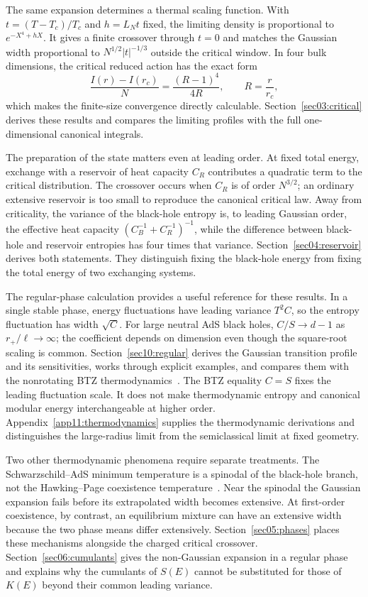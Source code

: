 \documentclass[11pt,letterpaper]{article}
\theoremstyle{plain}
\theoremstyle{definition}
\theoremstyle{remark}
\begin{document}
The same expansion determines a thermal scaling function. With $t=(T-T_c)/T_c$ and $h=L_Nt$ fixed, the limiting density is proportional to $e^{-X^4+hX}$. It gives a finite crossover through $t=0$ and matches the Gaussian width proportional to $N^{1/2}|t|^{-1/3}$ outside the critical window. In four bulk dimensions, the critical reduced action has the exact form
\begin{equation}
 \frac{I(r)-I(r_c)}{N}=\frac{(R-1)^4}{4R},\qquad R=\frac r{r_c},
 \label{eq01:exact_action}
\end{equation}
which makes the finite-size convergence directly calculable. Section~\ref{sec03:critical} derives these results and compares the limiting profiles with the full one-dimensional canonical integrals.

The preparation of the state matters even at leading order. At fixed total energy, exchange with a reservoir of heat capacity $C_R$ contributes a quadratic term to the critical distribution. The crossover occurs when $C_R$ is of order $N^{3/2}$; an ordinary extensive reservoir is too small to reproduce the canonical critical law. Away from criticality, the variance of the black-hole entropy is, to leading Gaussian order, the effective heat capacity $(C_B^{-1}+C_R^{-1})^{-1}$, while the difference between black-hole and reservoir entropies has four times that variance. Section~\ref{sec04:reservoir} derives both statements. They distinguish fixing the black-hole energy from fixing the total energy of two exchanging systems.

The regular-phase calculation provides a useful reference for these results. In a single stable phase, energy fluctuations have leading variance $T^2C$, so the entropy fluctuation has width $\sqrt C$. For large neutral AdS black holes, $C/S\to d-1$ as $r_+/\ell\to\infty$; the coefficient depends on dimension even though the square-root scaling is common. Section~\ref{sec10:regular} derives the Gaussian transition profile and its sensitivities, works through explicit examples, and compares them with the nonrotating BTZ thermodynamics~\cite{banados1992}. The BTZ equality $C=S$ fixes the leading fluctuation scale. It does not make thermodynamic entropy and canonical modular energy interchangeable at higher order. Appendix~\ref{app11:thermodynamics} supplies the thermodynamic derivations and distinguishes the large-radius limit from the semiclassical limit at fixed geometry.

Two other thermodynamic phenomena require separate treatments. The Schwarzschild--AdS minimum temperature is a spinodal of the black-hole branch, not the Hawking--Page coexistence temperature~\cite{hawkingpage1983}. Near the spinodal the Gaussian expansion fails before its extrapolated width becomes extensive. At first-order coexistence, by contrast, an equilibrium mixture can have an extensive width because the two phase means differ extensively. Section~\ref{sec05:phases} places these mechanisms alongside the charged critical crossover. Section~\ref{sec06:cumulants} gives the non-Gaussian expansion in a regular phase and explains why the cumulants of $S(E)$ cannot be substituted for those of $K(E)$ beyond their common leading variance.
\end{document}
